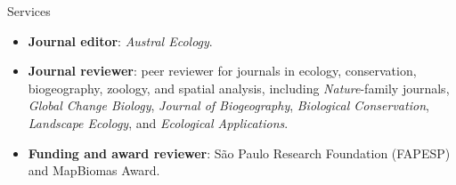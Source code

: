 \documentclass{resume}
\begin{document}
\begin{rSection}{Services}
\begin{itemize}
\item \textbf{Journal editor}: \textit{Austral Ecology}.
\item \textbf{Journal reviewer}: peer reviewer for journals in ecology, conservation, biogeography, zoology, and spatial analysis, including \textit{Nature}-family journals, \textit{Global Change Biology}, \textit{Journal of Biogeography}, \textit{Biological Conservation}, \textit{Landscape Ecology}, and \textit{Ecological Applications}.
\item \textbf{Funding and award reviewer}: São Paulo Research Foundation (FAPESP) and MapBiomas Award.
\end{itemize}
\end{rSection}
\end{document}
